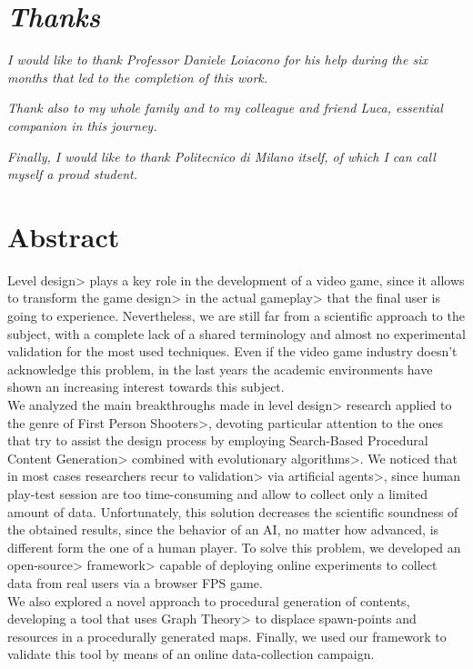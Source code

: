 \chapter{\textit{Thanks}}

\textit{I would like to thank Professor Daniele Loiacono for his help during the six months that led to the completion of this work.}

\par \mbox{}

\textit{Thank also to my whole family and to my colleague and friend Luca, essential companion in this journey.}

\par \mbox{}

\textit{Finally, I would like to thank Politecnico di Milano itself, of which I can call myself a proud student.}

\par \mbox{}

\textit{}

\chapter{Abstract}

\<Level design> plays a key role in the development of a video game, since it allows to transform the \<game design> in the actual \<gameplay> that the final user is going to experience. Nevertheless, we are still far from a scientific approach to the subject, with a complete lack of a shared terminology and almost no experimental validation for the most used techniques. Even if the video game industry doesn't acknowledge this problem, in the last years the academic environments have shown an increasing interest towards this subject. \\
We analyzed the main breakthroughs made in \<level design> research applied to the genre of \<First Person Shooters>, devoting particular attention to the ones that try to assist the design process by employing \<Search-Based Procedural Content Generation> combined with \<evolutionary algorithms>. We noticed that in most cases researchers recur to \<validation> via \<artificial agents>, since human play-test session are too time-consuming and allow to collect only a limited amount of data. Unfortunately, this solution decreases the scientific soundness of the obtained results, since the behavior of an AI, no matter how advanced, is different form the one of a human player. To solve this problem, we developed an \<open-source> \<framework> capable of deploying online experiments to collect data from real users via a browser FPS game. \\
We also explored a novel approach to procedural generation of contents, developing a tool that uses \<Graph Theory> to displace spawn-points and resources in a procedurally generated maps. Finally, we used our framework to validate this tool by means of an online data-collection campaign. 

